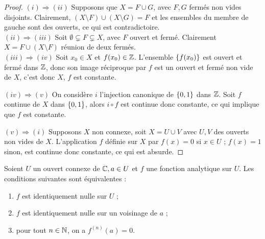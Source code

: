 \begin{proof}
$(i) \Rightarrow (ii)$ Supposons que $X = F \cup G$, avec $F, G$ fermés non vides disjoints.
Clairement, $(X \setminus F) \cup (X \setminus G) = F$ et les ensembles du membre de gauche sont des ouverts, ce qui est contradictoire. \\

$(ii) \Rightarrow (iii)$ Soit $\emptyset \subsetneq F \subsetneq X$, avec $F$ ouvert et fermé. 
Clairement $X= F \cup (X \setminus F)$ réunion de deux fermés. \\

$(iii) \Rightarrow (iv)$ Soit $x_0 \in X$ et $f(x_0) \in \mathbb{Z}$. L'ensemble $\{ f(x_0) \}$ est ouvert et fermé dans $\mathbb{Z}$, 
donc son image réciproque par $f$ est un ouvert et fermé non vide de $X$, c'est donc $X$, $f$ est constante.

$(iv) \Rightarrow (v)$ On considère $i$ l'injection canonique de $\{ 0,1 \}$ dans $\mathbb{Z}$. Soit $f$ continue de $X$ dans $\{ 0,1 \}$,
alors $i \circ f$ est continue donc constante, ce qui implique que $f$ est constante.

$(v) \Rightarrow (i)$ Supposons $X$ non connexe, soit $X = U \cup V$ avec $U, V$ des ouverts non vides de $X$.
L'application $f$ définie sur $X$ par $f(x) = 0$ si $x \in U$ ; $f(x) = 1$ sinon, est continue donc constante, ce qui est absurde.
\end{proof}

\begin{thm}
\label{thm:1}
Soient $U$ un ouvert connexe de $\mathbb{C}, a \in U$ et $f$ une fonction analytique sur $U$. Les conditions suivantes sont équivalentes :
\begin{enumerate}[label=(\roman*)]
\item $f$ est identiquement nulle sur $U$ ;
\item $f$ est identiquement nulle sur un voisinage de $a$ ;
\item pour tout $n \in \mathbb{N}$, on a $f^{(n)}(a) = 0$.
\end{enumerate}
\end{thm}

